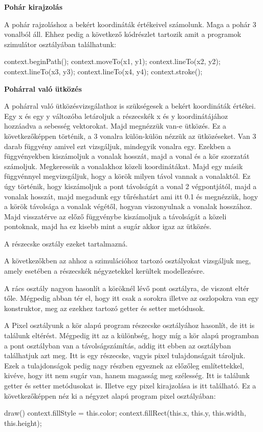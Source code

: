\textbf{Pohár kirajzolás}

A pohár rajzoláshoz a bekért koordináták értékeivel számolunk. Maga a pohár 3 vonalból áll. Ehhez pedig a következő kódrészlet tartozik amit a programok szimulátor osztályában találhatunk:
\begin{java}
context.beginPath();
context.moveTo(x1, y1);
context.lineTo(x2, y2);
context.lineTo(x3, y3);
context.lineTo(x4, y4);
context.stroke();
\end{java}


\textbf{Pohárral való ütközés}

A pohárral való ütközésvizsgálathoz is szükségesek a bekért koordináták értékei. Egy x és egy y változóba letároljuk a részecskék x és y koordinátájához hozzáadva a sebesség vektorokat. Majd megnézzük van-e ütközés. Ez a következőképpen történik, a 3 vonalra külön-külön nézzük az ütközéseket. Van 3 darab függvény amivel ezt vizsgáljuk, mindegyik vonalra egy. Ezekben a függvényekben kiszámoljuk a vonalak hosszát, majd a vonal és a kör szorzatát számoljuk. Megkeressük a vonalakhoz közeli koordinátákat. Majd egy másik függvénnyel megvizsgáljuk, hogy a körök milyen távol vannak a vonalaktól. Ez úgy történik, hogy kiszámoljuk a pont távolságát a vonal 2 végpontjától, majd a vonalak hosszát, majd megadunk egy tűréshatárt ami itt 0.1 és megnézzük, hogy a körök távolsága a vonalak végétől, hogyan viszonyulnak a vonalak hosszához. Majd visszatérve az előző függvénybe kiszámoljuk a távolságát a közeli pontoknak, majd ha ez kisebb mint a sugár akkor igaz az ütközés. 

A részecske osztály ezeket tartalmazná. 


A következőkben az ahhoz a szimulációhoz tartozó osztályokat vizsgáljuk meg, amely esetében a részecskék négyzetekkel kerültek modellezésre.


A rács osztály nagyon hasonlít a köröknél lévő pont osztályra, de viszont eltér tőle. Mégpedig abban tér el, hogy itt csak a sorokra illetve az oszlopokra van egy konstruktor, meg az ezekhez tartozó getter és setter metódusok. 



A Pixel osztályunk a kör alapú program részecske osztályához hasonlít, de itt is találunk eltérést. Mégpedig itt az a különbség, hogy míg a kör alapú programban a pont osztályban van a távolságszámítás, addig itt ebben az osztályban találhatjuk azt meg. Itt is egy részecske, vagyis pixel tulajdonságait tároljuk. Ezek a tulajdonságok pedig nagy részben egyeznek az előzőleg említettekkel, kivéve, hogy itt nem sugár van, hanem magasság meg szélesség. Itt is találunk getter és setter metódusokat is. Illetve egy pixel kirajzolása is itt található. Ez a következőképpen néz ki a négyzet alapú program pixel osztályában:
\begin{java}
  draw()
  {
    context.fillStyle = this.color;
    context.fillRect(this.x, this.y, this.width, this.height);
  }
\end{java} 

